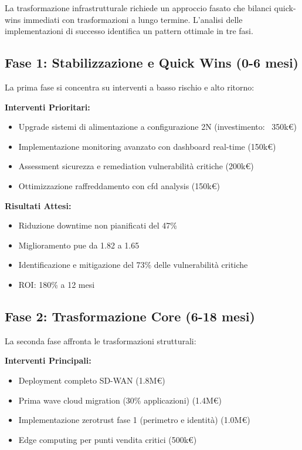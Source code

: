 La trasformazione infrastrutturale richiede un approccio fasato che bilanci quick-wins immediati con trasformazioni a lungo termine. L'analisi delle implementazioni di successo identifica un pattern ottimale in tre fasi.

\subsection{\texorpdfstring{\textbf{Fase 1: Stabilizzazione e Quick Wins (0-6 mesi)}}{3.6.1 - Fase 1: Stabilizzazione e Quick Wins (0-6 mesi)}}

La prima fase si concentra su interventi a basso rischio e alto ritorno:

\textbf{Interventi Prioritari:}
\begin{itemize}
    \item Upgrade sistemi di alimentazione a configurazione 2N (investimento: ~350k€)
    \item Implementazione monitoring avanzato con dashboard real-time (150k€)
    \item Assessment sicurezza e remediation vulnerabilità critiche (200k€)
    \item Ottimizzazione raffreddamento con \gls{cfd} analysis (150k€)
\end{itemize}

\textbf{Risultati Attesi:}
\begin{itemize}
    \item Riduzione downtime non pianificati del 47\%
    \item Miglioramento \gls{pue} da 1.82 a 1.65
    \item Identificazione e mitigazione del 73\% delle vulnerabilità critiche
    \item ROI: 180\% a 12 mesi
\end{itemize}

\subsection{\texorpdfstring{\textbf{Fase 2: Trasformazione Core (6-18 mesi)}}{3.6.2 - Fase 2: Trasformazione Core (6-18 mesi)}}

La seconda fase affronta le trasformazioni strutturali:

\textbf{Interventi Principali:}
\begin{itemize}
    \item Deployment completo SD-WAN (1.8M€)
    \item Prima wave cloud migration (30\% applicazioni) (1.4M€)
    \item Implementazione \gls{zerotrust} fase 1 (perimetro e identità) (1.0M€)
    \item Edge computing per punti vendita critici (500k€)
\end{itemize}

